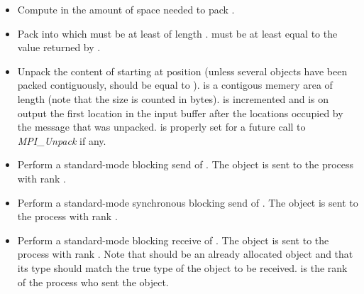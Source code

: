 \begin{itemize}
\item {}
  \sshortdescribe Compute in  the amount of space needed to pack .
\item {}
  \sshortdescribe Pack  into  which must be at least of
  length .  must be at least equal to the value returned
  by . 
\item {}
  \sshortdescribe Unpack the content of  starting at position
   (unless several objects have been packed contiguously,  should be equal to ).  is a contigous memery area
  of length  (note that the size is counted in bytes).
   is incremented and is on output the first location in the input
  buffer after the locations occupied by the message that was
  unpacked.  is properly set for a future call to {\it MPI_Unpack}
  if any.
  
\item {}
  \sshortdescribe Perform a standard-mode blocking send of . The
  object is sent to the process with rank .

\item {}
  \sshortdescribe Perform a standard-mode synchronous blocking send of
  . The object is sent to the process with rank .
  
\item {} 
  \sshortdescribe Perform a standard-mode blocking receive of . The
  object is sent to the process with rank . Note that 
  should be an already allocated object and that its type should match the
  true type of the object to be received.  is the rank of the
  process who sent the object.


\end{itemize}
